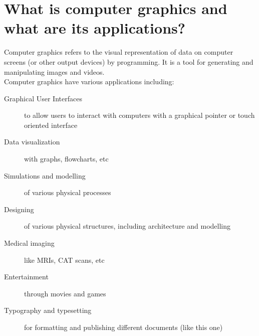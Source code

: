 \documentclass[a4paper,14pt,english,crop=false]{standalone}
\begin{document}
\section{What is computer graphics and what are its applications?}
Computer graphics refers to the visual representation of data on computer
screens (or other output devices) by programming. It is a tool for generating
and manipulating images and videos.\\
Computer graphics have various applications including:
\begin{description}
  \item [Graphical User Interfaces] {to allow users to interact with computers
      with a graphical pointer or touch oriented interface}
  \item [Data visualization] {with graphs, flowcharts, etc}
  \item [Simulations and modelling] {of various physical processes}
  \item [Designing] {of various physical structures, including architecture and
      modelling}
  \item [Medical imaging] {like MRIs, CAT scans, etc}
  \item [Entertainment] {through movies and games}
  \item [Typography and typesetting] {for formatting and publishing different
      documents (like this one)}
\end{description}
\end{document}
